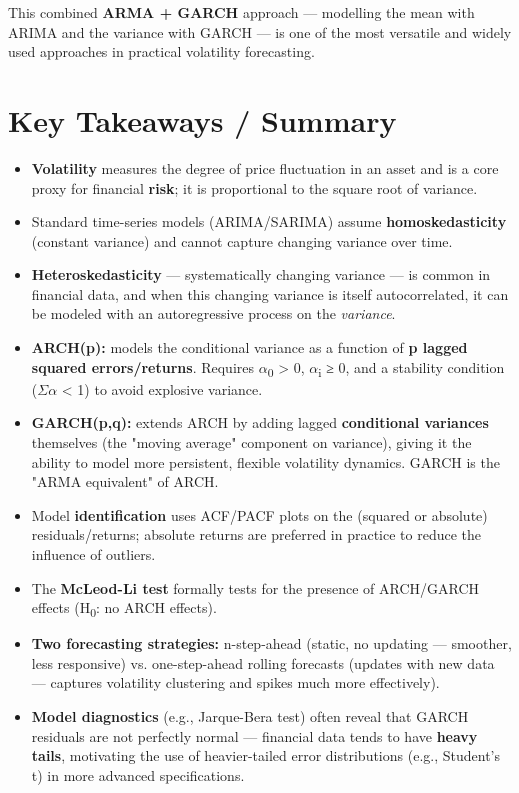 \documentclass[12pt,openany]{book}
\theoremstyle{definition}
\theoremstyle{remark}
\begin{document}
This combined \textbf{ARMA + GARCH} approach — modelling the mean with ARIMA and the variance with GARCH — is one of the most versatile and widely used approaches in practical volatility forecasting.


\section{Key Takeaways / Summary}

\begin{itemize}
\item \textbf{Volatility} measures the degree of price fluctuation in an asset and is a core proxy for financial \textbf{risk}; it is proportional to the square root of variance.
\item Standard time-series models (ARIMA/SARIMA) assume \textbf{homoskedasticity} (constant variance) and cannot capture changing variance over time.
\item \textbf{Heteroskedasticity} — systematically changing variance — is common in financial data, and when this changing variance is itself autocorrelated, it can be modeled with an autoregressive process on the \emph{variance}.
\item \textbf{ARCH(p):} models the conditional variance as a function of \textbf{p lagged squared errors/returns}. Requires \ensuremath{\alpha}\textsubscript{0} > 0, \ensuremath{\alpha}\textsubscript{i} ≥ 0, and a stability condition (\ensuremath{\Sigma}\ensuremath{\alpha} < 1) to avoid explosive variance.
\item \textbf{GARCH(p,q):} extends ARCH by adding lagged \textbf{conditional variances} themselves (the "moving average" component on variance), giving it the ability to model more persistent, flexible volatility dynamics. GARCH is the "ARMA equivalent" of ARCH.
\item Model \textbf{identification} uses ACF/PACF plots on the (squared or absolute) residuals/returns; absolute returns are preferred in practice to reduce the influence of outliers.
\item The \textbf{McLeod-Li test} formally tests for the presence of ARCH/GARCH effects (H\textsubscript{0}: no ARCH effects).
\item \textbf{Two forecasting strategies:} n-step-ahead (static, no updating — smoother, less responsive) vs. one-step-ahead rolling forecasts (updates with new data — captures volatility clustering and spikes much more effectively).
\item \textbf{Model diagnostics} (e.g., Jarque-Bera test) often reveal that GARCH residuals are not perfectly normal — financial data tends to have \textbf{heavy tails}, motivating the use of heavier-tailed error distributions (e.g., Student's t) in more advanced specifications.

\end{itemize}
\end{document}
